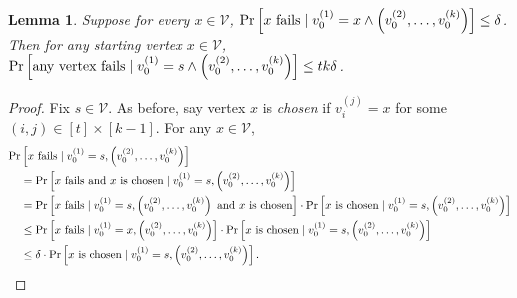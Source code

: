 \documentclass[10]{report}
\newtheorem{lemma}[theorem]{Lemma}
\begin{document}
\begin{lemma} \label{lem:rw:startbound}
Suppose for every $x \in \mathcal{V}$, $\Pr \left [\textnormal{$x$ fails} \mid v_0^{(1)} = x \wedge \left (v_0^{(2)}, \dots, v_0^{(k)} \right ) \right ] \leq \delta$.
Then for any starting vertex $x \in \mathcal{V}$, $\Pr \left [\textnormal{any vertex fails} \mid v_0^{(1)} = s \wedge \left (v_0^{(2)}, \dots, v_0^{(k)} \right ) \right ] \leq tk\delta$.
\end{lemma}
%
\begin{proof}
Fix $s \in \mathcal{V}$.
As before, say vertex $x$ is \emph{chosen} if $v_i^{(j)} = x$ for some $(i, j) \in [t] \times [k-1]$.
For any $x \in \mathcal{V}$, 
%
\begin{align}
\nonumber
\Pr& \left [ \textnormal{$x$ fails} \mid v_0^{(1)} = s, \left (v_0^{(2)}, \dots, v_0^{(k)} \right ) \right ]
\\
\nonumber
&=
\Pr \left [ \textnormal{$x$ fails and $x$ is chosen} \mid v_0^{(1)} = s, \left (v_0^{(2)}, \dots, v_0^{(k)} \right ) \right ]
\\
\nonumber
&=
\Pr \left [ \textnormal{$x$ fails} \mid v_0^{(1)} = s, \left (v_0^{(2)}, \dots, v_0^{(k)} \right ) \textnormal{ and $x$ is chosen} \right ] \cdot
\Pr \left [ \textnormal{$x$ is chosen} \mid v_0^{(1)} = s, \left (v_0^{(2)}, \dots, v_0^{(k)} \right ) \right ]
\\
\nonumber
&\leq
\Pr \left [ \textnormal{$x$ fails} \mid v_0^{(1)} = x, \left (v_0^{(2)}, \dots, v_0^{(k)} \right ) \right ] \cdot
\Pr \left [ \textnormal{$x$ is chosen} \mid v_0^{(1)} = s, \left (v_0^{(2)}, \dots, v_0^{(k)} \right ) \right ]
\\
\label{eq:rw:sample:fail:prob}
&\leq
\delta \cdot
\Pr \left [ \textnormal{$x$ is chosen} \mid v_0^{(1)} = s, \left (v_0^{(2)}, \dots, v_0^{(k)} \right ) \right ].
\end{align}
%


\end{proof}
\end{document}
